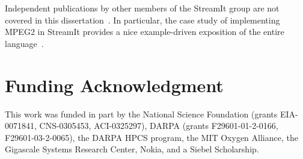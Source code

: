 Independent publications by other members of the StreamIt group are
not covered in this
dissertation~\cite{kuo05,drake-ipdps06,zhang_lightweight_2007}.  In
particular, the case study of implementing MPEG2 in StreamIt provides
a nice example-driven exposition of the entire
language~\cite{drake-ipdps06}.

\section*{Funding Acknowledgment}
This work was funded in part by the National Science Foundation
(grants EIA-0071841, CNS-0305453, ACI-0325297), DARPA (grants
F29601-01-2-0166, F29601-03-2-0065), the DARPA HPCS program, the MIT
Oxygen Alliance, the Gigascale Systems Research Center, Nokia, and a
Siebel Scholarship.
\clearpage

%
%
%
% 
%
%
%
%
%
%

